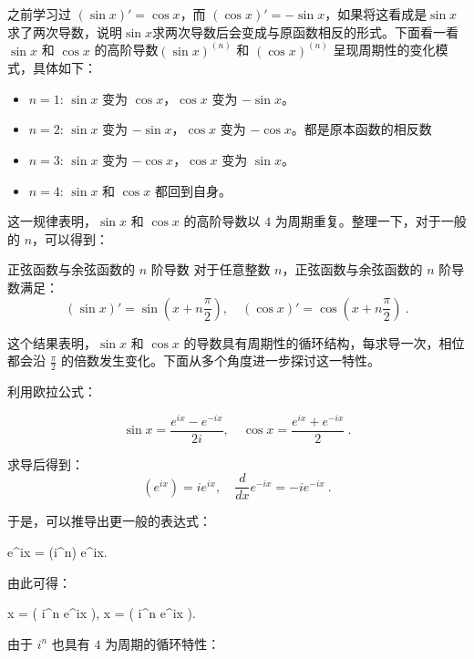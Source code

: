 之前学习过 $(\sin x)' = \cos x$，而 $(\cos x)' = -\sin x$，如果将这看成是$\sin x$ 求了两次导数，说明$\sin x$求两次导数后会变成与原函数相反的形式。下面看一看$\sin x$ 和 $\cos x$ 的高阶导数$(\sin x)^{(n)}$ 和 $(\cos x)^{(n)}$ 呈现周期性的变化模式，具体如下：
\begin{itemize}
\item $n = 1$: $\sin x$ 变为 $\cos x$，$\cos x$ 变为 $-\sin x$。
\item $n = 2$: $\sin x$ 变为 $-\sin x$，$\cos x$ 变为 $-\cos x$。都是原本函数的相反数
\item $n = 3$: $\sin x$ 变为 $-\cos x$，$\cos x$ 变为 $\sin x$。
\item $n = 4$: $\sin x$ 和 $\cos x$ 都回到自身。
\end{itemize}
这一规律表明，$\sin x$ 和 $\cos x$ 的高阶导数以 $4$ 为周期重复。整理一下，对于一般的 $n$，可以得到：

\begin{corollary}{正弦函数与余弦函数的 $n$ 阶导数}
对于任意整数 $n$，正弦函数与余弦函数的 $n$ 阶导数满足：
\begin{equation}
(\sin x)' = \sin\left(x + n\frac{\pi}{2}\right), \quad
(\cos x)'= \cos\left(x + n\frac{\pi}{2}\right)~.
\end{equation}
\end{corollary}

这个结果表明，$\sin x$ 和 $\cos x$ 的导数具有周期性的循环结构，每求导一次，相位都会沿 $\frac{\pi}{2}$ 的倍数发生变化。下面从多个角度进一步探讨这一特性。


利用欧拉公式：

\begin{equation}
\sin x = \frac{e^{ix} - e^{-ix}}{2i}, \quad \cos x = \frac{e^{ix} + e^{-ix}}{2}~.
\end{equation}


求导后得到：
\begin{equation}
(e^{ix}) = i e^{ix}, \quad \frac{d}{dx} e^{-ix} = -i e^{-ix}~.
\end{equation}



于是，可以推导出更一般的表达式：

 e^{ix} = (i^n) e^{ix}.

由此可得：

 \sin x =  \left( i^n e^{ix} \right), \quad
{} \cos x =  \left( i^n e^{ix} \right).

由于 $i^n$ 也具有 $4$ 为周期的循环特性：


